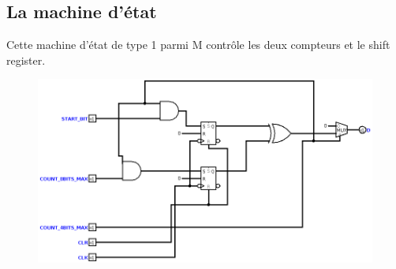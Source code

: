 \documentclass[a4paper]{article} %
\begin{document}
\subsection{La machine d’état}
Cette machine d’état de type 1 parmi M contrôle les deux compteurs et le shift register.
\begin{tcolorbox}[colframe=Monokaimagenta,colback=white]

\begin{figure}[H]
\centering
    \includegraphics[width=1\textwidth]{src/STAMAC.png}
    \label{fig:stamac}
\end{figure}



\end{tcolorbox}
\end{document}

